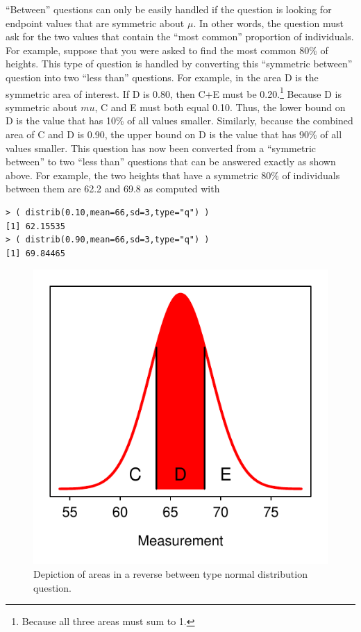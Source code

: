 \documentclass[10pt,openany]{book}\usepackage[]{graphicx}\usepackage[]{color}
\makeatletter
\newenvironment{kframe}{%
 \def\at@end@of@kframe{}%
 \ifinner\ifhmode%
  \def\at@end@of@kframe{\end{minipage}}%
  \begin{minipage}{\columnwidth}%
 \fi\fi%
 \def\FrameCommand##1{\hskip\@totalleftmargin \hskip-\fboxsep
 \colorbox{shadecolor}{##1}\hskip-\fboxsep
     \hskip-\linewidth \hskip-\@totalleftmargin \hskip\columnwidth}%
 \MakeFramed {\advance\hsize-\width
   \@totalleftmargin\z@ \linewidth\hsize
   \@setminipage}}%
 {\par\unskip\endMakeFramed%
 \at@end@of@kframe}
\newenvironment{knitrout}{}{} %
\makeatother
\begin{document}
``Between'' questions can only be easily handled if the question is looking for endpoint values that are symmetric about $\mu$.  In other words, the question must ask for the two values that contain the ``most common'' proportion of individuals.  For example, suppose that you were asked to find the most common 80\% of heights.  This type of question is handled by converting this ``symmetric between'' question into two ``less than'' questions.  For example, in  the area D is the symmetric area of interest.  If D is 0.80, then C+E must be 0.20.\footnote{Because all three areas must sum to 1.}  Because D is symmetric about $mu$, C and E must both equal 0.10.  Thus, the lower bound on D is the value that has 10\% of all values smaller.  Similarly, because the combined area of C and D is 0.90, the upper bound on D is the value that has 90\% of all values smaller.  This question has now been converted from a ``symmetric between'' to two ``less than'' questions that can be answered exactly as shown above.  For example, the two heights that have a symmetric 80\% of individuals between them are 62.2 and 69.8 as computed with
\begin{knitrout}
\color{fgcolor}\begin{kframe}
\begin{verbatim}
> ( distrib(0.10,mean=66,sd=3,type="q") )
[1] 62.15535
> ( distrib(0.90,mean=66,sd=3,type="q") )
[1] 69.84465
\end{verbatim}
\end{kframe}
\end{knitrout}

\begin{knitrout}
\color{fgcolor}\begin{figure}[hbtp]

{\centering \includegraphics[width=.4\linewidth]{Figs/NormRevBetween-1} 

}

\caption[Depiction of areas in a reverse between type normal distribution question]{Depiction of areas in a reverse between type normal distribution question.}\label{fig:NormRevBetween}
\end{figure}


\end{knitrout}
\end{document}
